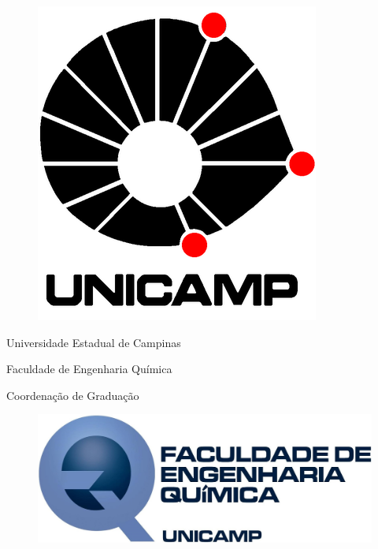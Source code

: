 
\begin{titlepage}
\begin{center}

\begin{minipage}{0.13\linewidth}
    \begin{flushleft}
        \begin{figure}[H]
    		\includegraphics[scale=0.21]{Imagens/LOGO-UNICAMP.png}
    	\end{figure}
    \end{flushleft}
\end{minipage}
\begin{minipage}{0.6\linewidth}
	\begin{center}
		
		Universidade Estadual de Campinas
		
		Faculdade de Engenharia Química
		
		Coordenação de Graduação
		
	\end{center}
\end{minipage}
\begin{minipage}{0.25\linewidth}
    \begin{flushleft}
        \begin{figure}[H]
    		\includegraphics[scale=0.3]{Imagens/LOGO-EQ.jpg}
    	\end{figure}
    \end{flushleft}
\end{minipage}


\end{center}
\end{titlepage}
